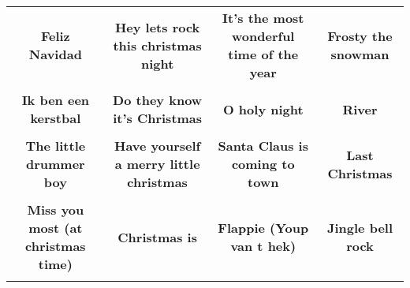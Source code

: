 \documentclass[12pt]{article} \usepackage{eso-pic, graphicx}
\newcommand{\background}[1]{%
\AddToShipoutPictureBG*{\texttt{[image: \#1]}}
}
\begin{document}
\tabcolsep=30.2pt \renewcommand{\arraystretch}{4.5}   \vspace*{4.3cm} \begin{center}  \begin{tabular}{c c c c}
\parbox{3cm}{\centering \textbf{Feliz Navidad}}& 
\parbox{3cm}{\centering \textbf{Hey lets rock this christmas night}}& 
\parbox{3cm}{\centering \textbf{It’s the most wonderful time of the year}}& 
\parbox{3cm}{\centering \textbf{Frosty the snowman}}\\ \\ 
\parbox{3cm}{\centering \textbf{Ik ben een kerstbal}}& 
\parbox{3cm}{\centering \textbf{Do they know it's Christmas}}& 
\parbox{3cm}{\centering \textbf{O holy night}}& 
\parbox{3cm}{\centering \textbf{River}}\\ \\ 
\parbox{3cm}{\centering \textbf{The little drummer boy}}& 
\parbox{3cm}{\centering \textbf{Have yourself a merry little christmas}}& 
\parbox{3cm}{\centering \textbf{Santa Claus is coming to town}}& 
\parbox{3cm}{\centering \textbf{Last Christmas}}\\ \\ 
\parbox{3cm}{\centering \textbf{Miss you most (at christmas time)}}& 
\parbox{3cm}{\centering \textbf{Christmas is}}& 
\parbox{3cm}{\centering \textbf{Flappie (Youp van t hek)}}& 
\parbox{3cm}{\centering \textbf{Jingle bell rock}}\\ \\ 
\end{tabular} \background{discobingo.pdf} \end{center} 
\end{document}
